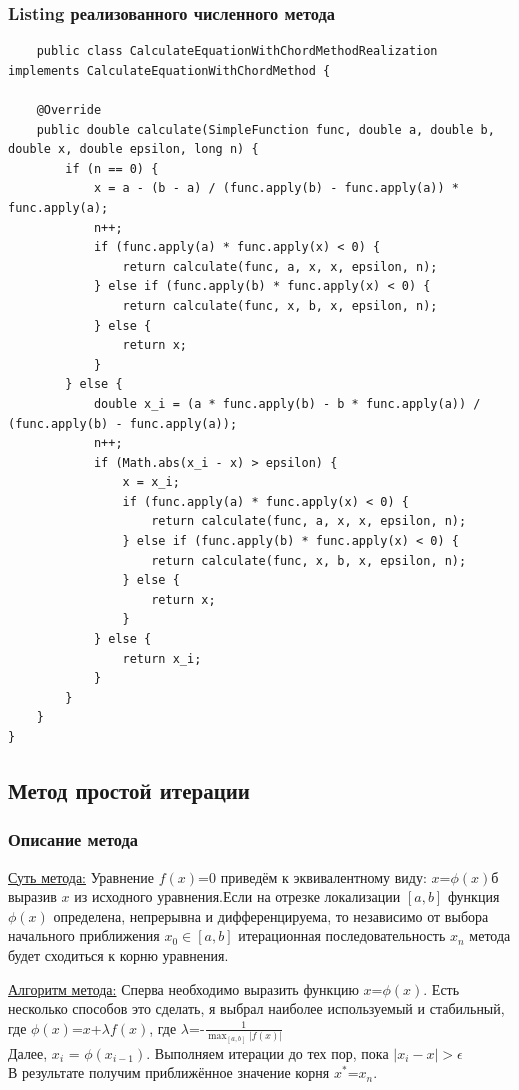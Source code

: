 \subsubsection{Listing реализованного численного метода}
\tiny
\begin{verbatim}
    public class CalculateEquationWithChordMethodRealization implements CalculateEquationWithChordMethod {
    
    @Override
    public double calculate(SimpleFunction func, double a, double b, double x, double epsilon, long n) {
        if (n == 0) {
            x = a - (b - a) / (func.apply(b) - func.apply(a)) * func.apply(a);
            n++;
            if (func.apply(a) * func.apply(x) < 0) {
                return calculate(func, a, x, x, epsilon, n);
            } else if (func.apply(b) * func.apply(x) < 0) {
                return calculate(func, x, b, x, epsilon, n);
            } else {
                return x;
            }
        } else {
            double x_i = (a * func.apply(b) - b * func.apply(a)) / (func.apply(b) - func.apply(a));
            n++;
            if (Math.abs(x_i - x) > epsilon) {
                x = x_i;
                if (func.apply(a) * func.apply(x) < 0) {
                    return calculate(func, a, x, x, epsilon, n);
                } else if (func.apply(b) * func.apply(x) < 0) {
                    return calculate(func, x, b, x, epsilon, n);
                } else {
                    return x;
                }
            } else {
                return x_i;
            }
        }
    }
}
\end{verbatim}
\normalsize
\newpage

\subsection{Метод простой итерации}

\subsubsection{Описание метода}
\underline{Суть метода:} Уравнение $f(x)$=0 приведём к эквивалентному виду: $x$=$\phi(x)$б выразив $x$ из исходного
уравнения.Если на отрезке локализации $[a,b]$ функция $\phi(x)$ определена, непрерывна и дифференцируема, то независимо
от выбора начального приближения $x_0$$\in$$[a,b]$ итерационная последовательность ${x_n}$ метода будет сходиться к корню
уравнения.


\underline{Алгоритм метода:} Сперва необходимо выразить функцию $x$=$\phi(x)$. Есть несколько способов это сделать, я выбрал
наиболее используемый и стабильный, где $\phi(x)$=$x$+$\lambda f(x)$, где $\lambda$=-$\frac{1}{\max_{[a,b]}|f(x)|}$\\
Далее, $x_i$ = $\phi(x_{i-1})$. Выполняем итерации до тех пор, пока $|x_i - x| > \epsilon$\\
В результате получим приближённое значение корня $x^*$=$x_n$.

